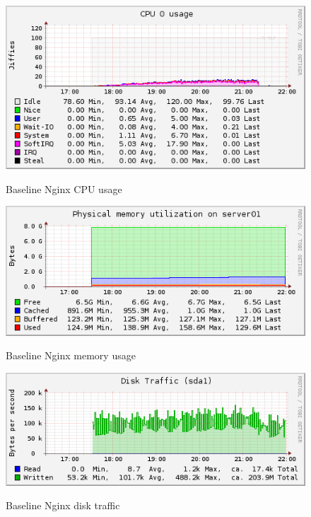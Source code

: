\documentclass[Measurements]{subfiles}
\begin{document}
\begin{figure}[H]
\centering
\caption{Baseline Nginx CPU usage}
\includegraphics[scale=0.7]{images/results/baseline/cpu.png}
\label{fig:Baseline Nginx CPU usage}
\end{figure}

\begin{figure}[H]
\centering
\caption{Baseline Nginx memory usage}
\includegraphics[scale=0.7]{images/results/baseline/memory.png}
\label{fig:Baseline Nginx memory usage}
\end{figure}

\begin{figure}[H]
\centering
\caption{Baseline Nginx disk traffic}
\includegraphics[scale=0.7]{images/results/baseline/disk.png}
\label{fig:Baseline Nginx disk traffic}
\end{figure}
\end{document}
